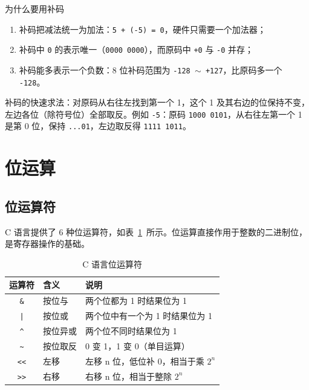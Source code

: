 \begin{anybox}{为什么要用补码}

\begin{enumerate}
\item 补码把减法统一为加法：\texttt{5 + (-5) = 0}，硬件只需要一个加法器；
\item 补码中 \texttt{0} 的表示唯一（\texttt{0000 0000}），而原码中 \texttt{+0} 与 \texttt{-0} 并存；
\item 补码能多表示一个负数：8 位补码范围为 \texttt{-128 $\sim$ +127}，比原码多一个 \texttt{-128}。
\end{enumerate}

补码的快速求法：对原码从右往左找到第一个 1，这个 1 及其右边的位保持不变，左边各位（除符号位）全部取反。例如 \texttt{-5}：原码 \texttt{1000 0101}，从右往左第一个 1 是第 0 位，保持 \texttt{...01}，左边取反得 \texttt{1111 1011}。

\end{anybox}
\section{位运算}

\subsection{位运算符}

C 语言提供了 6 种位运算符，如表~\ref{tab:bitop}~所示。位运算直接作用于整数的二进制位，是寄存器操作的基础。

\begin{table}[htbp]
\centering \caption{C 语言位运算符} \label{tab:bitop}
    \begin{tabular}{cll}
        \toprule
        运算符 & 含义 & 说明 \\
        \midrule
        \texttt{\&}  & 按位与 & 两个位都为 1 时结果位为 1 \\
        \texttt{|}  & 按位或 & 两个位中有一个为 1 时结果位为 1 \\
        \texttt{\^} & 按位异或 & 两个位不同时结果位为 1 \\
        \texttt{\~} & 按位取反 & 0 变 1，1 变 0（单目运算） \\
        \texttt{<<} & 左移 & 左移 n 位，低位补 0，相当于乘 $2^n$ \\
        \texttt{>>} & 右移 & 右移 n 位，相当于整除 $2^n$ \\
        \bottomrule
    \end{tabular}
\end{table}

